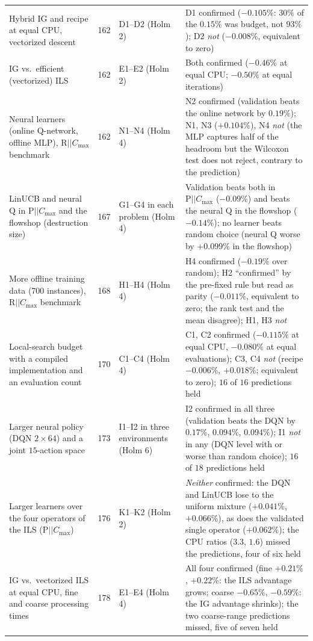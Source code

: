 \begin{longtable}{@{}p{}p{}p{}p{}@{}}
Hybrid IG and recipe at equal CPU, vectorized descent & 162 & D1--D2 (Holm 2) & D1 confirmed ($-0.105\%$: $30\%$ of the $0.15\%$ was budget, not $93\%$); D2 \emph{not} ($-0.008\%$, equivalent to zero) \\
IG vs.\ efficient (vectorized) ILS & 162 & E1--E2 (Holm 2) & Both confirmed ($-0.46\%$ at equal CPU; $-0.50\%$ at equal iterations) \\
Neural learners (online Q-network, offline MLP), $\mathrm{R}||C_{\max}$ benchmark & 162 & N1--N4 (Holm 4) & N2 confirmed (validation beats the online network by $0.19\%$); N1, N3 ($+0.104\%$), N4 \emph{not} (the MLP captures half of the headroom but the Wilcoxon test does not reject, contrary to the prediction) \\
LinUCB and neural Q in $\mathrm{P}||C_{\max}$ and the flowshop (destruction size) & 167 & G1--G4 in each problem (Holm 4) & Validation beats both in $\mathrm{P}||C_{\max}$ ($-0.09\%$) and beats the neural Q in the flowshop ($-0.14\%$); no learner beats random choice (neural Q worse by $+0.099\%$ in the flowshop) \\
More offline training data (700 instances), $\mathrm{R}||C_{\max}$ benchmark & 168 & H1--H4 (Holm 4) & H4 confirmed ($-0.19\%$ over random); H2 ``confirmed'' by the pre-fixed rule but read as parity ($-0.011\%$, equivalent to zero; the rank test and the mean disagree); H1, H3 \emph{not} \\
Local-search budget with a compiled implementation and an evaluation count & 170 & C1--C4 (Holm 4) & C1, C2 confirmed ($-0.115\%$ at equal CPU, $-0.080\%$ at equal evaluations); C3, C4 \emph{not} (recipe $-0.006\%$, $+0.018\%$; equivalent to zero); $16$ of $16$ predictions held \\
Larger neural policy (DQN $2\times64$) and a joint $15$-action space & 173 & I1--I2 in three environments (Holm 6) & I2 confirmed in all three (validation beats the DQN by $0.17\%$, $0.094\%$, $0.094\%$); I1 \emph{not} in any (DQN level with or worse than random choice); $16$ of $18$ predictions held \\
Larger learners over the four operators of the ILS ($\mathrm{P}||C_{\max}$) & 176 & K1--K2 (Holm 2) & \emph{Neither} confirmed: the DQN and LinUCB lose to the uniform mixture ($+0.041\%$, $+0.066\%$), as does the validated single operator ($+0.062\%$); the CPU ratios ($3.3$, $1.6$) missed the predictions, four of six held \\
IG vs.\ vectorized ILS at equal CPU, fine and coarse processing times & 178 & E1--E4 (Holm 4) & All four confirmed (fine $+0.21\%$, $+0.22\%$: the ILS advantage grows; coarse $-0.65\%$, $-0.59\%$: the IG advantage shrinks); the two coarse-range predictions missed, five of seven held \\

\end{longtable}
